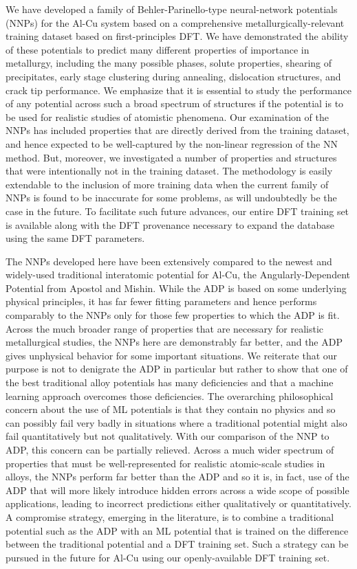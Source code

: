 \documentclass{article}
\begin{document}
We have developed a family of Behler-Parinello-type neural-network potentials (NNPs) for the Al-Cu system based on a comprehensive metallurgically-relevant training dataset based on first-principles DFT.  We have demonstrated the ability of these potentials to predict many different properties of importance in metallurgy, including the many possible phases, solute properties, shearing of precipitates, early stage clustering during annealing, dislocation structures, and crack tip performance.  We emphasize that it is essential to study the performance of any potential across such a broad spectrum of structures if the potential is to be used for realistic studies of atomistic phenomena.  Our examination of the NNPs has included properties that are directly derived from the training dataset, and hence expected to be well-captured by the non-linear regression of the NN method.  But, moreover, we investigated a number of properties and structures that were intentionally not in the training dataset.  The methodology is easily extendable to the inclusion of more training data when the current family of NNPs is found to be inaccurate for some problems, as will undoubtedly be the case in the future.  To facilitate such future advances, our entire DFT training set is available along with the DFT provenance necessary to expand the database using the same DFT parameters.

The NNPs developed here have been extensively compared to the newest and widely-used traditional interatomic potential for Al-Cu, the Angularly-Dependent Potential from Apostol and Mishin.  While the ADP is based on some underlying physical principles, it has far fewer fitting parameters and hence performs comparably to the NNPs only for those few properties to which the ADP is fit.  Across the much broader range of properties that are necessary for realistic metallurgical studies, the NNPs here are demonstrably far better, and the ADP gives unphysical behavior for some important situations.  We reiterate that our purpose is not to denigrate the ADP in particular but rather to show that one of the best traditional alloy potentials has many deficiencies and that a machine learning approach overcomes those deficiencies.  The overarching philosophical concern about the use of ML potentials is that they contain no physics and so can possibly fail very badly in situations where a traditional potential might also fail quantitatively but not qualitatively.  With our comparison of the NNP to ADP, this concern can be partially relieved.  Across a much wider spectrum of properties that must be well-represented for realistic atomic-scale studies in alloys, the NNPs perform far better than the ADP and so it is, in fact, use of the ADP that will more likely introduce hidden errors across a wide scope of possible applications, leading to incorrect predictions either qualitatively or quantitatively.  A compromise strategy, emerging in the literature, is to combine a traditional potential such as the ADP with an ML potential that is trained on the difference between the traditional potential and a DFT training set.  Such a strategy can be pursued in the future for Al-Cu using our openly-available DFT training set.
\end{document}
